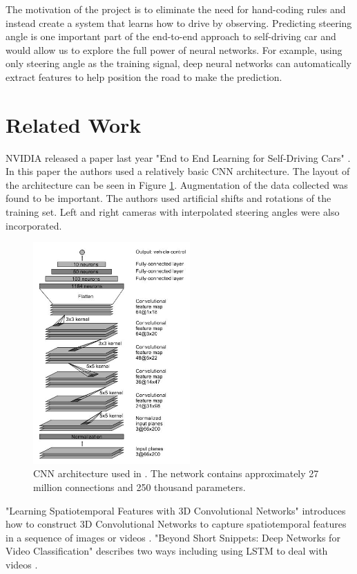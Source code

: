 \documentclass[10pt,twocolumn,letterpaper]{article}
\begin{document}
The motivation of the project is to eliminate the need for hand-coding rules and instead create a system that learns how to drive by observing. Predicting steering angle is one important part of the end-to-end approach to self-driving car and would allow us to explore the full power of neural networks. For example, using only steering angle as the training signal, deep neural networks can automatically extract features to help position the road to make the prediction.


\section{Related Work}

NVIDIA released a paper last year "End to End Learning for Self-Driving Cars" \cite{bojarski2016end}. In this paper the authors used a relatively basic CNN architecture. The layout of the architecture can be seen in Figure \ref{nvidiaimage}. Augmentation of the data collected was found to be important. The authors used artificial shifts and rotations of the training set. Left and right cameras with interpolated steering angles were also incorporated.
\begin{figure}[!htb]
	\includegraphics[width=6cm]{nvidiacnn}
	\centering
	\caption{CNN architecture used in \cite{bojarski2016end}. The network contains approximately 27 million connections and 250 thousand parameters.}
	\label{nvidiaimage}
\end{figure}


"Learning Spatiotemporal Features with 3D Convolutional Networks" introduces how to construct 3D Convolutional Networks to capture spatiotemporal features in a sequence of images or videos \cite{Tran_2015_ICCV}. "Beyond Short Snippets: Deep Networks for Video Classification" describes two ways including using LSTM to deal with videos \cite{yue2015beyond}.
\end{document}
